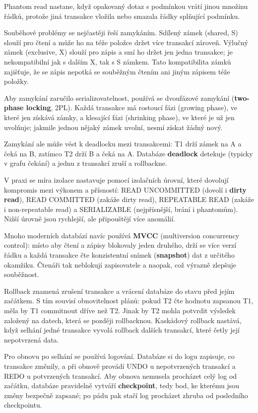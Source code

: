 Phantom read nastane, když opakovaný dotaz s podmínkou vrátí jinou množinu řádků, protože jiná transakce vložila nebo smazala řádky splňující podmínku.

Souběhové problémy se nejčastěji řeší zamykáním. Sdílený zámek (shared, S) slouží pro čtení a může ho na téže položce držet více transakcí zároveň. Výlučný zámek (exclusive, X) slouží pro zápis a smí ho držet jen jedna transakce; je nekompatibilní jak s dalším X, tak s S zámkem. Tato kompatibilita zámků zajišťuje, že se zápis nepotká se souběžným čtením ani jiným zápisem téže položky.

Aby zamykání zaručilo serializovatelnost, používá se dvoufázové zamykání (\textbf{two-phase locking}, 2PL). Každá transakce má rostoucí fázi (growing phase), ve které jen získává zámky, a klesající fázi (shrinking phase), ve které je už jen uvolňuje; jakmile jednou nějaký zámek uvolní, nesmí získat žádný nový.

Zamykání ale může vést k deadlocku mezi transakcemi: T1 drží zámek na A a čeká na B, zatímco T2 drží B a čeká na A. Databáze \textbf{deadlock} detekuje (typicky v grafu čekání) a jednu z transakcí zruší a rollbackne.

V praxi se míra izolace nastavuje pomocí izolačních úrovní, které dovolují kompromis mezi výkonem a přísností: READ UNCOMMITTED (dovolí i \textbf{dirty read}), READ COMMITTED (zakáže dirty read), REPEATABLE READ (zakáže i non-repeatable read) a SERIALIZABLE (nejpřísnější, brání i phantomům). Nižší úrovně jsou rychlejší, ale připouštějí více anomálií.

Mnoho moderních databází navíc používá \textbf{MVCC} (multiversion concurrency control): místo aby čtení a zápisy blokovaly jeden druhého, drží se více verzí řádku a každá transakce čte konzistentní snímek (\textbf{snapshot}) dat z určitého okamžiku. Čtenáři tak neblokují zapisovatele a naopak, což výrazně zlepšuje souběžnost.

Rollback znamená zrušení transakce a vrácení databáze do stavu před jejím začátkem. S tím souvisí obnovitelnost plánů: pokud T2 čte hodnotu zapsanou T1, měla by T1 commitnout dříve než T2. Jinak by T2 mohla potvrdit výsledek založený na datech, která se později rollbacknou. Kaskádový rollback nastává, když selhání jedné transakce vyvolá rollback dalších transakcí, které četly její nepotvrzená data.

Pro obnovu po selhání se používá logování. Databáze si do logu zapisuje, co transakce změnily, a při obnově provádí UNDO u nepotvrzených transakcí a REDO u potvrzených transakcí. Aby obnova nemusela procházet celý log od začátku, databáze pravidelně vytváří \textbf{checkpoint}, tedy bod, ke kterému jsou změny bezpečně zapsané; po pádu pak stačí log procházet zhruba od posledního checkpointu.

